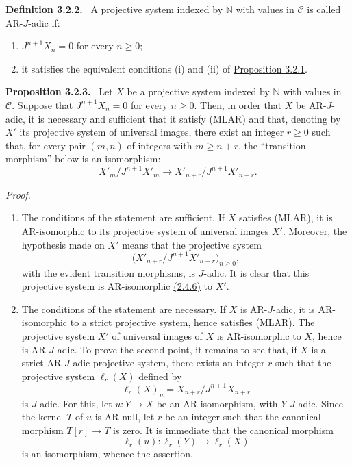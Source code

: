 \documentclass[11pt]{article}
\providecommand{\NN}{\mathbb{N}}
\newenvironment{statement}[1]{\par\medskip\noindent\textbf{#1.}\ }{\par\medskip}
\newenvironment{prooftext}[1][Proof]{\par\noindent\emph{#1.}\ }{\par\medskip}
\providecommand{\NN}{\mathbb N}
\providecommand{\cC}{\mathcal C}
\providecommand{\cC}{\mathcal C}
\begin{document}
\label{sga5:V:definition:3.2.2}\begin{statement}{Definition 3.2.2}
A projective system indexed by $\NN$ with values in $\cC$ is called AR-$J$-adic if:
\begin{enumerate}[label=(\alph*)]
\item $J^{n+1}X_n=0$ for every $n\ge0$;
\item it satisfies the equivalent conditions (i) and (ii) of \hyperref[sga5:V:proposition:3.2.1]{Proposition 3.2.1}.
\end{enumerate}
\end{statement}

\label{sga5:V:proposition:3.2.3}\begin{statement}{Proposition 3.2.3}
Let $X$ be a projective system indexed by $\NN$ with values in $\cC$. Suppose that $J^{n+1}X_n=0$ for every $n\ge0$. Then, in order that $X$ be AR-$J$-adic, it is necessary and sufficient that it satisfy (MLAR) and that, denoting by $X'$ its projective system of universal images, there exist an integer $r\ge0$ such that, for every pair $(m,n)$ of integers with $m\ge n+r$, the ``transition morphism'' below is an isomorphism:
\[
X'_m/J^{n+1}X'_m\longrightarrow X'_{n+r}/J^{n+1}X'_{n+r}.
\]
\end{statement}

\begin{prooftext}[Proof]
\begin{enumerate}[label=(\alph*)]
\item The conditions of the statement are sufficient. If $X$ satisfies (MLAR), it is AR-isomorphic to its projective system of universal images $X'$. Moreover, the hypothesis made on $X'$ means that the projective system
\[
\bigl(X'_{n+r}/J^{n+1}X'_{n+r}\bigr)_{n\ge0},
\]
with the evident transition morphisms, is $J$-adic. It is clear that this projective system is AR-isomorphic \hyperref[sga5:V:definition:2.4.6]{(2.4.6)} to $X'$.
\item The conditions of the statement are necessary. If $X$ is AR-$J$-adic, it is AR-isomorphic to a strict projective system, hence satisfies (MLAR). The projective system $X'$ of universal images of $X$ is AR-isomorphic to $X$, hence is AR-$J$-adic. To prove the second point, it remains to see that, if $X$ is a strict AR-$J$-adic projective system, there exists an integer $r$ such that the projective system $\ell_r(X)$ defined by
\[
\ell_r(X)_n=X_{n+r}/J^{n+1}X_{n+r}
\]
is $J$-adic. For this, let $u:Y\to X$ be an AR-isomorphism, with $Y$ $J$-adic. Since the kernel $T$ of $u$ is AR-null, let $r$ be an integer such that the canonical morphism $T[r]\to T$ is zero. It is immediate that the canonical morphism
\[
\ell_r(u):\ell_r(Y)\longrightarrow\ell_r(X)
\]
is an isomorphism, whence the assertion.
\end{enumerate}
\end{prooftext}
\end{document}
